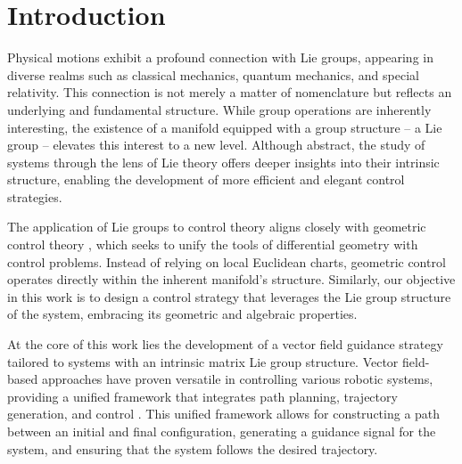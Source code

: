 \chapter{Introduction}\label{chap:Intro}
Physical motions exhibit a profound connection with Lie groups, appearing in diverse realms such as classical mechanics, quantum mechanics, and special relativity. This connection is not merely a matter of nomenclature but reflects an underlying and fundamental structure. While group operations are inherently interesting, the existence of a manifold equipped with a group structure -- a Lie group -- elevates this interest to a new level. Although abstract, the study of systems through the lens of Lie theory offers deeper insights into their intrinsic structure, enabling the development of more efficient and elegant control strategies.

The application of Lie groups to control theory aligns closely with geometric control theory \citep{Bullo2004}, which seeks to unify the tools of differential geometry with control problems. Instead of relying on local Euclidean charts, geometric control operates directly within the inherent manifold's structure. Similarly, our objective in this work is to design a control strategy that leverages the Lie group structure of the system, embracing its geometric and algebraic properties.

At the core of this work lies the development of a vector field guidance strategy tailored to systems with an intrinsic matrix Lie group structure. Vector field-based approaches have proven versatile in controlling various robotic systems, providing a unified framework that integrates path planning, trajectory generation, and control \citep{goncalves2010vectorfield,yao2021singularity,Rezende2022,Gao2022,nunes2023quadcopter,yao2022topological,Chen2025}. This unified framework allows for constructing a path between an initial and final configuration, generating a guidance signal for the system, and ensuring that the system follows the desired trajectory.

